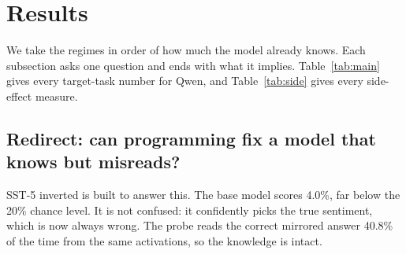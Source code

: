 \section{Results}
\label{sec:results}

We take the regimes in order of how much the model already knows. Each subsection asks one question and ends with what it implies. Table~\ref{tab:main} gives every target-task number for Qwen, and Table~\ref{tab:side} gives every side-effect measure.

\begin{table}[p]
\centering\small

\caption{Accuracy (\%) and NLL on Qwen2.5-1.5B. Test accuracy carries a bootstrap 95\% interval. WSP runs \texttt{r}$n$ were programmed by Fable and \texttt{o1} by Opus. \texttt{p1} used the preserve brief. *Twin-2K \texttt{r1} used Fable 5.1 and an earlier brief that discouraged item-level tables; its dev figure is the programmer's own. For runs scored only on test by us, dev is the programmer's full-dev measurement, recomputed by the auditor. LoRA is seed 0; Table~\ref{tab:reliability} gives the other seeds. For facts, LoRA is the fifteen-epoch configuration (Section~\ref{sec:compile}).}
\label{tab:main}
\end{table}

\subsection{Redirect: can programming fix a model that knows but misreads?}
\label{sec:redirect}
SST-5 inverted is built to answer this. The base model scores 4.0\%, far below the 20\% chance level. It is not confused: it confidently picks the true sentiment, which is now always wrong. The probe reads the correct mirrored answer 40.8\% of the time from the same activations, so the knowledge is intact.

